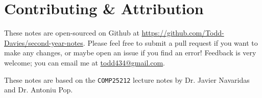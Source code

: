 \section*{Contributing \& Attribution}

These notes are open-sourced on Github at
\url{https://github.com/Todd-Davies/second-year-notes}. Please feel free to
submit a pull request if you want to make any changes, or maybe open an issue
if you find an error! Feedback is very welcome; you can email me at
\href{mailto:todd434@gmail.com}{todd434@gmail.com}.

These notes are based on the \texttt{COMP25212} lecture notes by Dr. Javier
Navaridas and Dr. Antoniu Pop.

